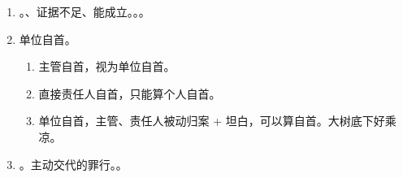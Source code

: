 \begin{enumerate}
\begin{enumerate}
\begin{enumerate}
\begin{enumerate}
                          \item 自动 = 不是被抓。。
                          \item 投案 = 主动置于司法机关控制之下。
                        \end{enumerate}
                  \item 如实供述。。
                        \begin{enumerate}
                          \item {}、共犯供全部。反面 \yjt 否认自己的行为。
                          \item 供述。主要犯罪事实。只关注罪，不关注证。。
                          \item vs 辩解。。
                        \end{enumerate}
                  \item {}。
                        \begin{enumerate}
                          \item {}。
                          \item {}。
                          \item {}。
                        \end{enumerate}
                \end{enumerate}
          \item {}。、证据不足、能成立。。。
          \item 单位自首。
                \begin{enumerate}
                  \item 主管自首，视为单位自首。
                  \item 直接责任人自首，只能算个人自首。
                  \item 单位自首，主管、责任人被动归案 + 坦白，可以算自首。大树底下好乘凉。
                \end{enumerate}
          \item {}。主动交代的罪行。。

\end{enumerate}
\end{enumerate}
